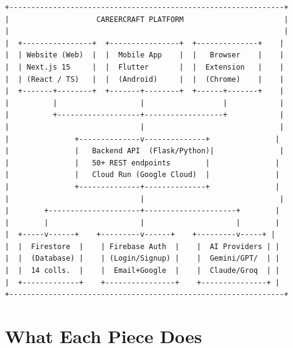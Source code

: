 \documentclass[12pt, a4paper]{report}
\begin{document}
\begin{lstlisting}[style=asciistyle, caption={CareerCraft system architecture}]
+---------------------------------------------------------------+
|                    CAREERCRAFT PLATFORM                       |
|                                                               |
|  +----------------+  +----------------+  +--------------+    |
|  | Website (Web)  |  |  Mobile App    |  |   Browser    |    |
|  | Next.js 15     |  |  Flutter       |  |  Extension   |    |
|  | (React / TS)   |  |  (Android)     |  |  (Chrome)    |    |
|  +-------+--------+  +-------+--------+  +------+-------+    |
|          |                   |                  |            |
|          +-------------------+------------------+            |
|                              |                               |
|               +--------------v--------------+               |
|               |   Backend API  (Flask/Python)|               |
|               |   50+ REST endpoints        |               |
|               |   Cloud Run (Google Cloud)  |               |
|               +--------------+--------------+               |
|                              |                               |
|        +---------------------+---------------------+        |
|        |                     |                     |        |
|  +-----v------+    +---------v------+    +---------v-----+ |
|  |  Firestore  |    | Firebase Auth  |    |  AI Providers | |
|  |  (Database) |    | (Login/Signup) |    |  Gemini/GPT/  | |
|  |  14 colls.  |    |  Email+Google  |    |  Claude/Groq  | |
|  +-------------+    +----------------+    +---------------+ |
+---------------------------------------------------------------+
\end{lstlisting}

\section{What Each Piece Does}
\end{document}
